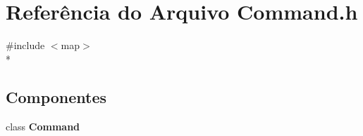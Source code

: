 \section{Referência do Arquivo Command.\+h}
\label{_command_8h}
{\ttfamily \#include $<$map$>$}\\*
\subsection*{Componentes}
\begin{DoxyCompactItemize}
\item 
class {\bf Command}
\end{DoxyCompactItemize}
